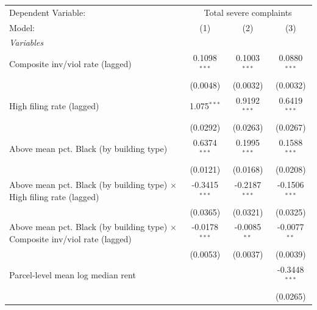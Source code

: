 \begingroup
\centering
\begin{tabular}{lccc}
   \tabularnewline \midrule \midrule
   Dependent Variable: & \multicolumn{3}{c}{Total severe complaints}\\
   Model:                                                                              & (1)             & (2)             & (3)\\  
   \midrule
   \emph{Variables}\\
   Composite inv/viol rate (lagged)                                                    & 0.1098$^{***}$  & 0.1003$^{***}$  & 0.0880$^{***}$\\   
                                                                                       & (0.0048)        & (0.0032)        & (0.0032)\\   
   High filing rate (lagged)                                                           & 1.075$^{***}$   & 0.9192$^{***}$  & 0.6419$^{***}$\\   
                                                                                       & (0.0292)        & (0.0263)        & (0.0267)\\   
   Above mean pct. Black (by building type)                                            & 0.6374$^{***}$  & 0.1995$^{***}$  & 0.1588$^{***}$\\   
                                                                                       & (0.0121)        & (0.0168)        & (0.0208)\\   
   Above mean pct. Black (by building type) $\times$ High filing rate (lagged)         & -0.3415$^{***}$ & -0.2187$^{***}$ & -0.1506$^{***}$\\   
                                                                                       & (0.0365)        & (0.0321)        & (0.0325)\\   
   Above mean pct. Black (by building type) $\times$ Composite inv/viol rate (lagged)  & -0.0178$^{***}$ & -0.0085$^{**}$  & -0.0077$^{**}$\\   
                                                                                       & (0.0053)        & (0.0037)        & (0.0039)\\   
   Parcel-level mean log median rent                                                   &                 &                 & -0.3448$^{***}$\\   
                                                                                       &                 &                 & (0.0265)\\   

\end{tabular}
